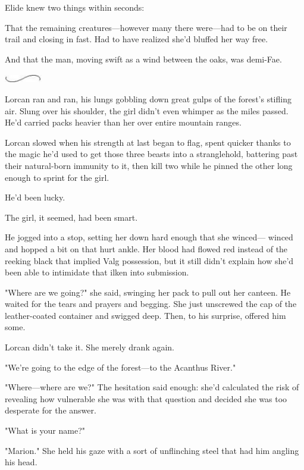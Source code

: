 Elide knew two things within seconds:

That the remaining creatures---however many there were---had to be on their trail and closing in fast.
Had to have realized she'd bluffed her way free.

And that the man, moving swift as a wind between the oaks, was demi-Fae.

\begin{center}
	\includegraphics[width=0.65in,height=0.13in]{images/seperator}
\end{center}

Lorcan ran and ran, his lungs gobbling down great gulps of the forest's stifling air.
Slung over his shoulder, the girl didn't even whimper as the miles passed.
He'd carried packs heavier than her over entire mountain ranges.

Lorcan slowed when his strength at last began to flag, spent quicker thanks to the magic he'd used to get those three beasts into a stranglehold, battering past their natural-born immunity to it, then kill two while he pinned the other long enough to sprint for the girl.

He'd been lucky.

The girl, it seemed, had been smart.

He jogged into a stop, setting her down hard enough that she winced--- winced and hopped a bit on that hurt ankle.
Her blood had flowed red instead of the reeking black that implied Valg possession, but it still didn't explain how she'd been able to intimidate that ilken into submission.

"Where are we going?"
she said, swinging her pack to pull out her canteen.
He waited for the tears and prayers and begging.
She just unscrewed the cap of the leather-coated container and swigged deep.
Then, to his surprise, offered him some.

Lorcan didn't take it.
She merely drank again.

"We're going to the edge of the forest---to the Acanthus River."

"Where---where are we?"
The hesitation said enough: she'd calculated the risk of revealing how vulnerable she was with that question 
and decided she was too desperate for the answer.

"What is your name?"

"Marion."
She held his gaze with a sort of unflinching steel that had him angling his head.

